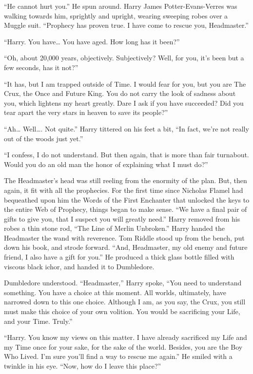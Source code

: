 “He cannot hurt you.” He spun around. Harry James Potter-Evans-Verres was walking towards him, sprightly and upright, wearing sweeping robes over a Muggle suit.  “Prophecy has proven true. I have come to rescue you, Headmaster.”

“Harry. You have… You have aged. How long has it been?”

“Oh, about 20,000 years, objectively. Subjectively? Well, for you, it’s been but a few seconds, has it not?”

“It has, but I am trapped outside of Time. I would fear for you, but you are The Crux, the Once and Future King. You do not carry the look of sadness about you, which lightens my heart greatly. Dare I ask if you have succeeded? Did you tear apart the very stars in heaven to save its people?”

“Ah… Well…. Not quite.” Harry tittered on his feet a bit, “In fact, we’re not really out of the woods just yet.”

“I confess, I do not understand. But then again, that is more than fair turnabout. Would you do an old man the honor of explaining what I must do?”
\simpleline
{}

The Headmaster’s head was still reeling from the enormity of the plan. But, then again, it fit with all the prophecies. For the first time since Nicholas Flamel had bequeathed upon him the Words of the First Enchanter that unlocked the keys to the entire Web of Prophecy, things began to make sense.
\SmallVSpace
“We have a final pair of gifts to give you, that I suspect you will greatly need.” Harry removed from his robes a thin stone rod, “The Line of Merlin Unbroken.” Harry handed the Headmaster the wand with reverence.
\SmallVSpace
Tom Riddle stood up from the bench, put down his book, and strode forward. “And, Headmaster, my old enemy and future friend, I also have a gift for you.” He produced a thick glass bottle filled with viscous black ichor, and handed it to Dumbledore.

Dumbledore understood.
\SmallVSpace
“Headmaster,” Harry spoke, “You need to understand something. You have a choice at this moment. All worlds, ultimately, have narrowed down to this one choice. Although I am, as you say, the Crux, you still must make this choice of your own volition. You would be sacrificing your Life, and your Time. Truly.”

“Harry. You know my views on this matter. I have already sacrificed my Life and my Time once for your sake, for the sake of the world. Besides, you are the Boy Who Lived. I’m sure you’ll find a way to rescue me again.” He smiled with a twinkle in his eye. “Now, how do I leave this place?”

